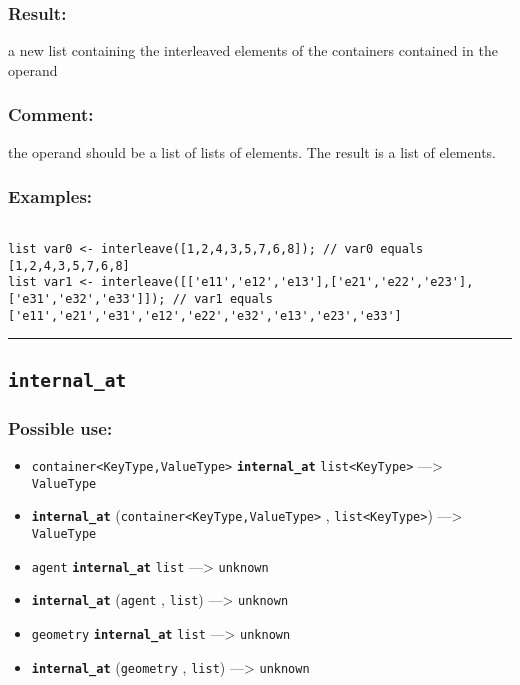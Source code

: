 \documentclass[]{book}
\providecommand{\tightlist}{%
  \setlength{\itemsep}{0pt}\setlength{\parskip}{0pt}}
\theoremstyle{definition}
\theoremstyle{definition}
\theoremstyle{definition}
\theoremstyle{remark}
\begin{document}
\subsubsection{Result:}\label{result-268}

a new list containing the interleaved elements of the containers
contained in the operand

\subsubsection{Comment:}\label{comment-54}

the operand should be a list of lists of elements. The result is a list
of elements.

\subsubsection{Examples:}\label{examples-211}

\begin{verbatim}
 
list var0 <- interleave([1,2,4,3,5,7,6,8]); // var0 equals [1,2,4,3,5,7,6,8] 
list var1 <- interleave([['e11','e12','e13'],['e21','e22','e23'],['e31','e32','e33']]); // var1 equals ['e11','e21','e31','e12','e22','e32','e13','e23','e33']
\end{verbatim}

\begin{center}\rule{0.5\linewidth}{\linethickness}\end{center}

\subsection{\texorpdfstring{\texttt{internal\_at}}{internal\_at}}\label{internal_at}

\subsubsection{Possible use:}\label{possible-use-279}

\begin{itemize}
\tightlist
\item
  \texttt{container\textless{}KeyType,ValueType\textgreater{}}
  \textbf{\texttt{internal\_at}}
  \texttt{list\textless{}KeyType\textgreater{}} ---\textgreater{}
  \texttt{ValueType}
\item
  \textbf{\texttt{internal\_at}}
  (\texttt{container\textless{}KeyType,ValueType\textgreater{}} ,
  \texttt{list\textless{}KeyType\textgreater{}}) ---\textgreater{}
  \texttt{ValueType}
\item
  \texttt{agent} \textbf{\texttt{internal\_at}} \texttt{list}
  ---\textgreater{} \texttt{unknown}
\item
  \textbf{\texttt{internal\_at}} (\texttt{agent} , \texttt{list})
  ---\textgreater{} \texttt{unknown}
\item
  \texttt{geometry} \textbf{\texttt{internal\_at}} \texttt{list}
  ---\textgreater{} \texttt{unknown}
\item
  \textbf{\texttt{internal\_at}} (\texttt{geometry} , \texttt{list})
  ---\textgreater{} \texttt{unknown}
\end{itemize}
\end{document}
